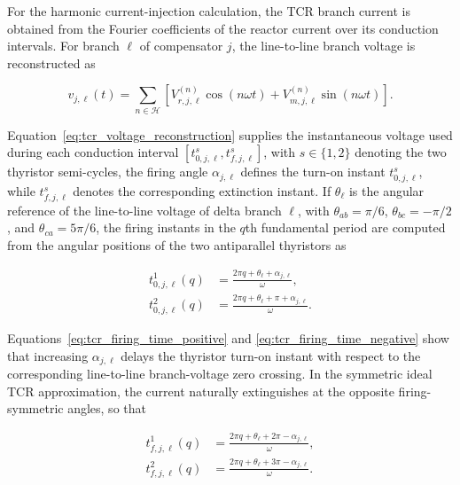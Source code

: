 \documentclass[journal]{IEEEtran}
\begin{document}
For the harmonic current-injection calculation, the TCR branch current is
obtained from the Fourier coefficients of the reactor current over its
conduction intervals. For branch $\ell$ of compensator $j$, the line-to-line branch voltage
is reconstructed as

\begin{equation}
    v_{j,\ell}(t)=
    \sum_{n\in\mathcal{H}}
    \left[V_{r,j,\ell}^{(n)}\cos(n\omega t)
    +V_{m,j,\ell}^{(n)}\sin(n\omega t)\right].
    \label{eq:tcr_voltage_reconstruction}
\end{equation}

Equation~\eqref{eq:tcr_voltage_reconstruction} supplies the instantaneous
voltage used during each conduction interval
$[t_{0,j,\ell}^{s},t_{f,j,\ell}^{s}]$, with $s\in\{1,2\}$ denoting the two
thyristor semi-cycles, the firing angle $\alpha_{j,\ell}$ defines the
turn-on instant $t_{0,j,\ell}^{s}$, while $t_{f,j,\ell}^{s}$ denotes the
corresponding extinction instant. If $\theta_{\ell}$ is the angular
reference of the line-to-line voltage of delta branch $\ell$, with
$\theta_{ab}=\pi/6$, $\theta_{bc}=-\pi/2$, and $\theta_{ca}=5\pi/6$, the
firing instants in the $q$th fundamental period are computed from the
angular positions of the two antiparallel thyristors as

\begin{align}
    t_{0,j,\ell}^{1}(q)
    &=\frac{2\pi q+\theta_{\ell}+\alpha_{j,\ell}}{\omega},
    \label{eq:tcr_firing_time_positive} \\
    t_{0,j,\ell}^{2}(q)
    &=\frac{2\pi q+\theta_{\ell}+\pi+\alpha_{j,\ell}}{\omega}.
    \label{eq:tcr_firing_time_negative}
\end{align}

Equations~\eqref{eq:tcr_firing_time_positive} and
\eqref{eq:tcr_firing_time_negative} show that increasing
$\alpha_{j,\ell}$ delays the thyristor turn-on
instant with respect to the corresponding line-to-line branch-voltage zero
crossing. In the symmetric ideal TCR approximation, the current naturally
extinguishes at the opposite firing-symmetric angles, so that

\begin{align}
    t_{f,j,\ell}^{1}(q)
    &=\frac{2\pi q+\theta_{\ell}+2\pi-\alpha_{j,\ell}}{\omega},
    \label{eq:tcr_extinction_time_positive} \\
    t_{f,j,\ell}^{2}(q)
    &=\frac{2\pi q+\theta_{\ell}+3\pi-\alpha_{j,\ell}}{\omega}.
    \label{eq:tcr_extinction_time_negative}
\end{align}
\end{document}
